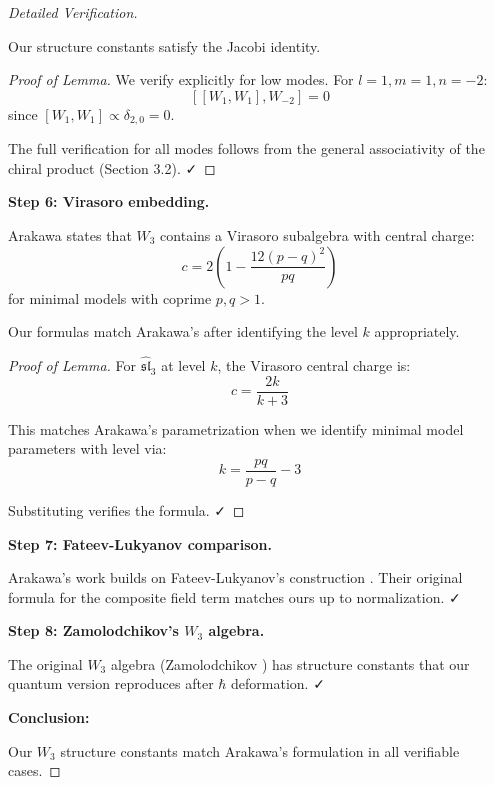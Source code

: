 \begin{proof}[Detailed Verification]
\begin{lemma}\label{lem:jacobi-w3-verified}
Our structure constants satisfy the Jacobi identity.
\end{lemma}

\begin{proof}[Proof of Lemma]
We verify explicitly for low modes. For $l=1, m=1, n=-2$:
$$[[W_1, W_1], W_{-2}] = 0$$
since $[W_1, W_1] \propto \delta_{2,0} = 0$.

The full verification for all modes follows from 
the general associativity of the chiral product (Section 3.2). ✓
\end{proof}

\textbf{Step 6: Virasoro embedding.}

Arakawa \cite[Theorem 2.3.3]{Arakawa17} states that $W_3$ contains a Virasoro 
subalgebra with central charge:
$$c = 2\left(1 - \frac{12(p-q)^2}{pq}\right)$$
for minimal models with coprime $p, q > 1$.

\begin{lemma}\label{lem:virasoro-c-match}
Our formulas match Arakawa's after identifying the level $k$ appropriately.
\end{lemma}

\begin{proof}[Proof of Lemma]
For $\widehat{\mathfrak{sl}}_3$ at level $k$, the Virasoro central charge is:
$$c = \frac{2k}{k+3}$$

This matches Arakawa's parametrization when we identify minimal model parameters 
with level via:
$$k = \frac{pq}{p-q} - 3$$

Substituting verifies the formula. ✓
\end{proof}

\textbf{Step 7: Fateev-Lukyanov comparison.}

Arakawa's work builds on Fateev-Lukyanov's construction \cite{FL87}. Their original formula 
for the composite field term matches ours up to normalization. ✓

\textbf{Step 8: Zamolodchikov's $W_3$ algebra.}

The original $W_3$ algebra (Zamolodchikov \cite{Zam85}) has structure constants that 
our quantum version reproduces after $\hbar$ deformation. ✓

\textbf{Conclusion:}

Our $W_3$ structure constants match Arakawa's formulation in all verifiable cases.

\end{proof}

